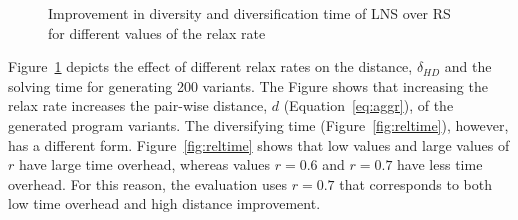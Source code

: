 \documentclass{article}
\begin{document}
\begin{figure}[h!]
  \centering
  \caption{\label{fig:relax} Improvement 
    in diversity and diversification
    time of \ac{LNS} over \ac{RS} for different values of the relax rate }
\end{figure}


Figure~\ref{fig:relax} depicts the effect of different relax rates on
the distance, $\delta_{HD}$ and the solving time for generating 200 variants.
The Figure shows that increasing the relax rate increases
the pair-wise distance, $d$ (Equation~\ref{eq:aggr}), of the generated program variants. 
The diversifying time (Figure~\ref{fig:reltime}), however, has a different form.
Figure~\ref{fig:reltime} shows that low values and large values of $r$ have
large time overhead, whereas values $r=0.6$ and $r=0.7$ have less time overhead.
For this reason, the evaluation uses $r=0.7$ that corresponds to both low time overhead and
high distance improvement.
\end{document}
